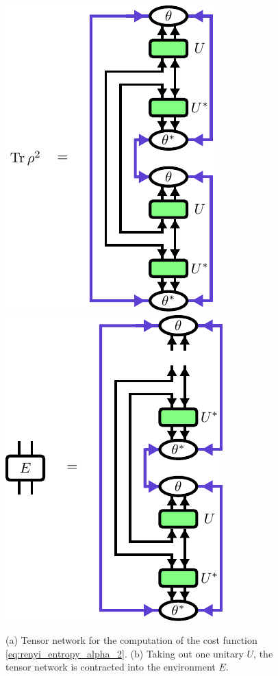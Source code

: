 \begin{figure}
	\centering
	\subcaptionbox{\label{fig:disentangling_evenbly_vidal_algorithm_trace_rho_squared}}
	{%
		\includegraphics[scale=1]{figures/tikz/YB_isoTPS/evenbly_vidal_renyi_2/evenbly_vidal_renyi_2_a.pdf}
	}
	\quad\quad\quad\quad
	\subcaptionbox{\label{fig:disentangling_evenbly_vidal_algorithm_environment_definition}}
	{%
		\includegraphics[scale=1]{figures/tikz/YB_isoTPS/evenbly_vidal_renyi_2/evenbly_vidal_renyi_2_b.pdf}
	}
	\caption{(a) Tensor network for the computation of the cost function \eqref{eq:renyi_entropy_alpha_2}. (b) Taking out one unitary $U$, the tensor network is contracted into the environment $E$.}
	\label{fig:disentangling_evenbly_vidal_algorithm}
\end{figure}
